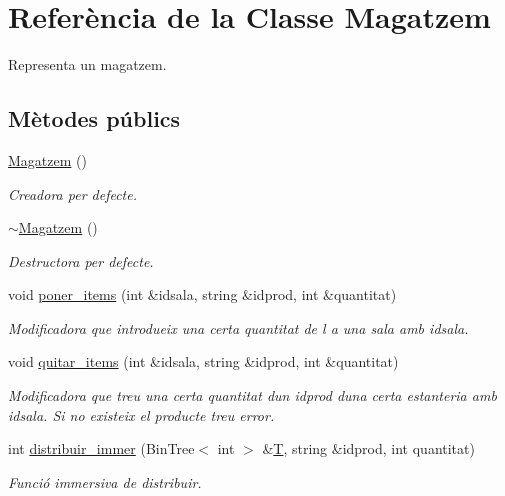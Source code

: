 \hypertarget{class_magatzem}{}\section{Referència de la Classe Magatzem}
\label{class_magatzem}


Representa un magatzem.  


\subsection*{Mètodes públics}
\begin{DoxyCompactItemize}
\item 
\hyperlink{class_magatzem_a5f17e941fe90f4294453be59cc691833}{Magatzem} ()
\begin{DoxyCompactList}\small\item\em Creadora per defecte. \end{DoxyCompactList}\item 
\hyperlink{class_magatzem_a1f8075615baf976e4c8182f0c73c178f}{$\sim$\+Magatzem} ()
\begin{DoxyCompactList}\small\item\em Destructora per defecte. \end{DoxyCompactList}\item 
void \hyperlink{class_magatzem_a82f901c8287586a33faa0f3c5030de11}{poner\+\_\+items} (int \&idsala, string \&idprod, int \&quantitat)
\begin{DoxyCompactList}\small\item\em Modificadora que introdueix una certa quantitat de l a una sala amb {\itshape idsala}. \end{DoxyCompactList}\item 
void \hyperlink{class_magatzem_afb609e5a5d912a56b8ae4f8e985602f5}{quitar\+\_\+items} (int \&idsala, string \&idprod, int \&quantitat)
\begin{DoxyCompactList}\small\item\em Modificadora que treu una certa quantitat d\textquotesingle{}un {\itshape idprod} d\textquotesingle{}una certa estanteria amb {\itshape idsala}. Si no existeix el producte treu error. \end{DoxyCompactList}\item 
int \hyperlink{class_magatzem_a586174830ec4d1df445fa54e260278ea}{distribuir\+\_\+immer} (Bin\+Tree$<$ int $>$ \&\hyperlink{class_magatzem_a59167aef8313d2dc57373eb7e442a38c}{T}, string \&idprod, int quantitat)
\begin{DoxyCompactList}\small\item\em Funció immersiva de distribuir. \end{DoxyCompactList}\item 

\end{DoxyCompactItemize}

